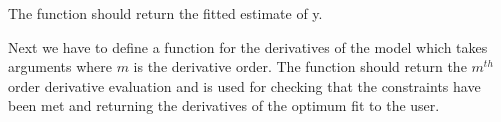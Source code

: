 \documentclass[letterpaper,10pt,english]{sphinxmanual}
\begin{document}
The function should return the fitted estimate of y.

\begin{sphinxVerbatim}[commandchars=\\\{\}]
      

      \PYG{p}{[}\PYG{p}{]}\PYG{p}{[}
        \PYG{p}{[}\PYG{p}{]}\PYG{p}{[}\PYG{p}{]}
           \PYG{p}{]} 

     
\end{sphinxVerbatim}

Next we have to define a function for the derivatives of the model which
takes arguments  where \({m}\) is
the derivative order. The function should return the \({m^{th}}\) order
derivative evaluation and is used for checking that the constraints have been
met and returning the derivatives of the optimum fit to the user.
\end{document}
